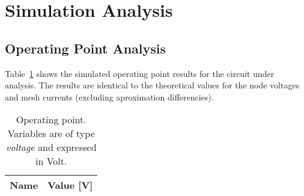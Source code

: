 \pagebreak
\section{Simulation Analysis}
\label{sec:simulation}

\subsection{Operating Point Analysis}

Table~\ref{tab:op} shows the simulated operating point results for the circuit
under analysis. The results are identical to the theoretical values for the node voltages and mesh currents (excluding aproximation differencies).

\begin{table}[h]
  \centering
  \begin{tabular}{|l|r|}
    \hline    
    {\bf Name} & {\bf Value [V]} \\ \hline
    
  \end{tabular}
  \caption{Operating point. Variables are of type {\it voltage} and expressed in Volt.}
  \label{tab:op}
\end{table}





